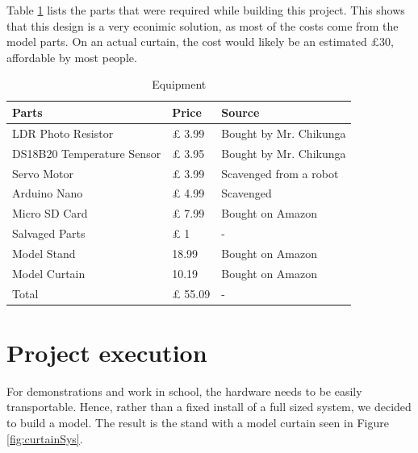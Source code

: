 \documentclass[a4paper,12pt]{article}
\begin{document}
Table \ref{tab:equipment} lists the parts that were required while building this project. This shows that this design is a very econimic solution,
as most of the costs come from the model parts. On an actual curtain, the cost would likely be an estimated £30, affordable by most people.

\begin{table}[h!]
    \caption{Equipment}
    \begin{tabular}{l | l | l}
        Parts & Price & Source \\
        \hline
        LDR Photo Resistor & £ 3.99 & Bought by Mr. Chikunga \\
        DS18B20 Temperature Sensor & £ 3.95 & Bought by Mr. Chikunga \\
        Servo Motor & £ 3.99 & Scavenged from a robot \\
        Arduino Nano & £ 4.99 & Scavenged \\
        Micro SD Card & £ 7.99 & Bought on Amazon \\
        Salvaged Parts & £ 1 & - \\
        Model Stand & 18.99 & Bought on Amazon \\
        Model Curtain & 10.19 & Bought on Amazon \\
        Total & £ 55.09 & - \\
    \end{tabular}
    \label{tab:equipment}
\end{table}

\section{Project execution}

For demonstrations and work in school, the hardware needs to be easily transportable. Hence, rather than a fixed install of a full sized system, we decided to build a model. 
The result is the stand with a model curtain seen in Figure \ref{fig:curtainSys}.
\end{document}
